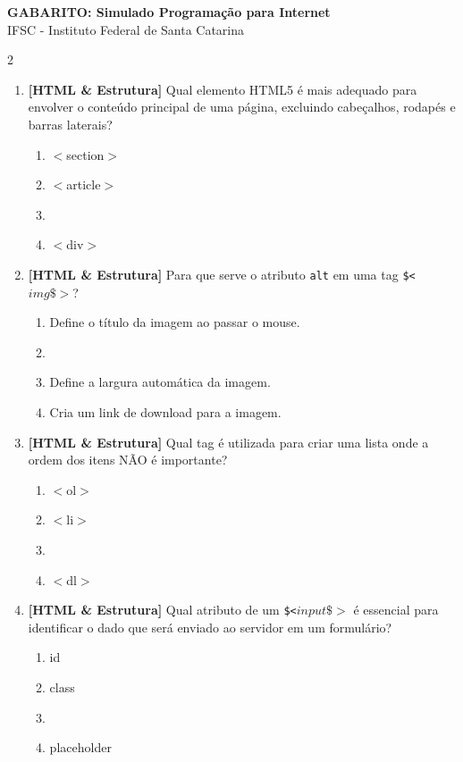 \documentclass[a4paper,10pt]{article}
\begin{document}
\begin{center}
    {\Large \textbf{GABARITO: Simulado Programação para Internet}} \\
    \vspace{0.1cm}
    {\small IFSC - Instituto Federal de Santa Catarina}
\end{center}

\begin{multicols*}{2}
\begin{enumerate}[label=\textbf{\arabic*.}, leftmargin=*]
\item \textbf{[HTML \& Estrutura]} Qual elemento HTML5 é mais adequado para envolver o conteúdo principal de uma página, excluindo cabeçalhos, rodapés e barras laterais?
\begin{enumerate}[label=(\alph*), noitemsep]
  \item $<$section$>$
  \item $<$article$>$
  \item {}
  \item $<$div$>$
\end{enumerate}

\item \textbf{[HTML \& Estrutura]} Para que serve o atributo \texttt{alt} em uma tag \texttt{\$<$img\$>$}?
\begin{enumerate}[label=(\alph*), noitemsep]
  \item Define o título da imagem ao passar o mouse.
  \item {}
  \item Define a largura automática da imagem.
  \item Cria um link de download para a imagem.
\end{enumerate}

\item \textbf{[HTML \& Estrutura]} Qual tag é utilizada para criar uma lista onde a ordem dos itens NÃO é importante?
\begin{enumerate}[label=(\alph*), noitemsep]
  \item $<$ol$>$
  \item $<$li$>$
  \item {}
  \item $<$dl$>$
\end{enumerate}

\item \textbf{[HTML \& Estrutura]} Qual atributo de um \texttt{\$<$input\$>$} é essencial para identificar o dado que será enviado ao servidor em um formulário?
\begin{enumerate}[label=(\alph*), noitemsep]
  \item id
  \item class
  \item {}
  \item placeholder
\end{enumerate}


\end{enumerate}
\end{multicols*}
\end{document}
